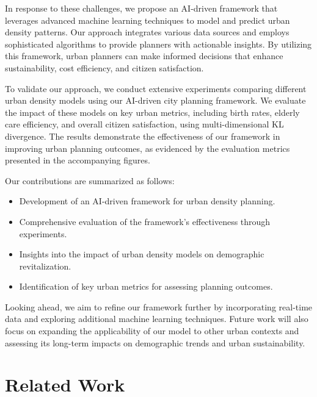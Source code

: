 \documentclass{article} %
\begin{document}
In response to these challenges, we propose an AI-driven framework that leverages advanced machine learning techniques to model and predict urban density patterns. Our approach integrates various data sources and employs sophisticated algorithms to provide planners with actionable insights. By utilizing this framework, urban planners can make informed decisions that enhance sustainability, cost efficiency, and citizen satisfaction.

To validate our approach, we conduct extensive experiments comparing different urban density models using our AI-driven city planning framework. We evaluate the impact of these models on key urban metrics, including birth rates, elderly care efficiency, and overall citizen satisfaction, using multi-dimensional KL divergence. The results demonstrate the effectiveness of our framework in improving urban planning outcomes, as evidenced by the evaluation metrics presented in the accompanying figures.

Our contributions are summarized as follows:
\begin{itemize}
    \item Development of an AI-driven framework for urban density planning.
    \item Comprehensive evaluation of the framework's effectiveness through experiments.
    \item Insights into the impact of urban density models on demographic revitalization.
    \item Identification of key urban metrics for assessing planning outcomes.
\end{itemize}

Looking ahead, we aim to refine our framework further by incorporating real-time data and exploring additional machine learning techniques. Future work will also focus on expanding the applicability of our model to other urban contexts and assessing its long-term impacts on demographic trends and urban sustainability.

\section{Related Work}
\label{sec:related}
% 
\end{document}
